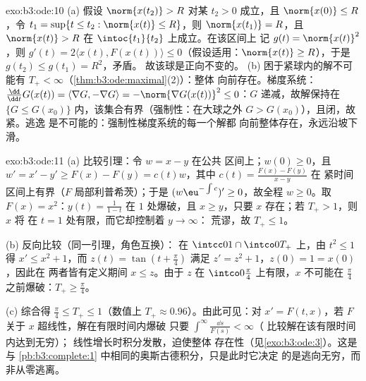\begin{solution}{exo:b3:ode:10}
(a) 假设 $\norm{x(t_2)} > R$ 对某 $t_2 > 0$ 成立，且
$\norm{x(0)} \leq R$，令 $t_1 = \sup\{t \leq t_2 :
\norm{x(t)} \leq R\}$，则 $\norm{x(t_1)} = R$，且
$\norm{x(t)} > R$ 在 $\intoc{t_1}{t_2}$ 上成立。在该区间上
记 $g(t) = \norm{x(t)}^2$，则 $g'(t) = 2\langle x(t),
F(x(t))\rangle \leq 0$（假设适用：$\norm{x(t)}
\geq R$），于是 $g(t_2) \leq g(t_1) = R^2$，矛盾。
故该球是正向不变的。
(b) 困于紧球内的解不可能有
$T_+ < \infty$（\cref{thm:b3:ode:maximal}(2)）：整体
向前存在。梯度系统：$\frac{\dd}{\dd t}G(x(t)) =
\langle\nabla G, -\nabla G\rangle = -\norm{\nabla G(x(t))}^2
\leq 0$：$G$ 递减，故解保持在 $\{G \leq
G(x_0)\}$ 内，该集合有界（强制性：在大球之外
$G > G(x_0)$），且闭，故紧。逃逸
是不可能的：强制性梯度系统的每一个解都
向前整体存在，永远沿坡下滑。
\end{solution}

\begin{solution}{exo:b3:ode:11}
(a) 比较引理：令 $w = x - y$ 在公共
区间上；$w(0) \geq 0$，且 $w' = x' - y' \geq F(x) - F(y) =
c(t)w$，其中 $c(t) = \frac{F(x) - F(y)}{x - y}$ 在
紧时间区间上有界（$F$ 局部利普希茨）；于是
$(w\eu^{-\int c})' \geq 0$，故全程 $w \geq 0$。取
$F(x) = x^2$：$y(t) = \frac1{1 - t}$ 在 $1$ 处爆破，且 $x
\geq y$，只要 $x$ 存在；若 $T_+ > 1$，则 $x$ 将
在 $t = 1$ 处有限，而它却控制着 $y \to \infty$：
荒谬，故 $T_+ \leq 1$。

(b) 反向比较（同一引理，角色互换）：
在 $\intcc01\cap\intco0{T_+}$ 上，由 $t^2 \leq 1$ 得 $x' \leq
x^2 + 1$，而 $z(t) = \tan(t + \frac\pi4)$ 满足 $z' =
z^2 + 1$，$z(0) = 1 = x(0)$，因此在
两者皆有定义期间 $x \leq z$。由于 $z$ 在
$\intco0{\frac\pi4}$ 上有限，$x$ 不可能在
$\frac\pi4$ 之前爆破：$T_+ \geq \frac\pi4$。

(c) 综合得 $\frac\pi4 \leq T_+ \leq 1$（数值上 $T_+
\approx 0.96$）。由此可见：对 $x' = F(t, x)$，若 $F$
关于 $x$ 超线性，解在有限时间内爆破
只要 $\int^\infty\frac{\dd s}{F(s)} < \infty$（
比较解在该有限时间内达到无穷）；
线性增长时积分发散，迫使整体
存在性（见\cref{exo:b3:ode:3}）。这是
与 \cref{pb:b3:complete:1} 中相同的奥斯古德积分，只是此时它决定
的是逃向无穷，而非从零逃离。
\end{solution}

